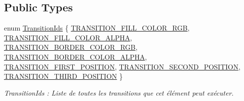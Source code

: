\subsection*{Public Types}
\begin{DoxyCompactItemize}
\item 
enum \hyperlink{classns_shape_1_1_triangle_adef21dd21ed3b5e4aa378f264abbe758}{Transition\+Ids} \{ \newline
\hyperlink{classns_shape_1_1_triangle_adef21dd21ed3b5e4aa378f264abbe758a9f20afd121f616d684ec0bd6b31dab54}{T\+R\+A\+N\+S\+I\+T\+I\+O\+N\+\_\+\+F\+I\+L\+L\+\_\+\+C\+O\+L\+O\+R\+\_\+\+R\+GB}, 
\hyperlink{classns_shape_1_1_triangle_adef21dd21ed3b5e4aa378f264abbe758a62867e3ea6657dbc0f9cc61bdca87be8}{T\+R\+A\+N\+S\+I\+T\+I\+O\+N\+\_\+\+F\+I\+L\+L\+\_\+\+C\+O\+L\+O\+R\+\_\+\+A\+L\+P\+HA}, 
\hyperlink{classns_shape_1_1_triangle_adef21dd21ed3b5e4aa378f264abbe758a43cba48c71b5804af47f7e1d5e1ecc9a}{T\+R\+A\+N\+S\+I\+T\+I\+O\+N\+\_\+\+B\+O\+R\+D\+E\+R\+\_\+\+C\+O\+L\+O\+R\+\_\+\+R\+GB}, 
\hyperlink{classns_shape_1_1_triangle_adef21dd21ed3b5e4aa378f264abbe758a541ff20fa337c2bfaaf7b29fbce4f586}{T\+R\+A\+N\+S\+I\+T\+I\+O\+N\+\_\+\+B\+O\+R\+D\+E\+R\+\_\+\+C\+O\+L\+O\+R\+\_\+\+A\+L\+P\+HA}, 
\newline
\hyperlink{classns_shape_1_1_triangle_adef21dd21ed3b5e4aa378f264abbe758aba96bb1e08665d081bedc72f56a85976}{T\+R\+A\+N\+S\+I\+T\+I\+O\+N\+\_\+\+F\+I\+R\+S\+T\+\_\+\+P\+O\+S\+I\+T\+I\+ON}, 
\hyperlink{classns_shape_1_1_triangle_adef21dd21ed3b5e4aa378f264abbe758a183e546c687567c28475575d67a12562}{T\+R\+A\+N\+S\+I\+T\+I\+O\+N\+\_\+\+S\+E\+C\+O\+N\+D\+\_\+\+P\+O\+S\+I\+T\+I\+ON}, 
\hyperlink{classns_shape_1_1_triangle_adef21dd21ed3b5e4aa378f264abbe758a634481d887d4cd8f6d5349d795c930cc}{T\+R\+A\+N\+S\+I\+T\+I\+O\+N\+\_\+\+T\+H\+I\+R\+D\+\_\+\+P\+O\+S\+I\+T\+I\+ON}
 \}\begin{DoxyCompactList}\small\item\em Transition\+Ids \+: Liste de toutes les transitions que cet élément peut exécuter. \end{DoxyCompactList}
\end{DoxyCompactItemize}
